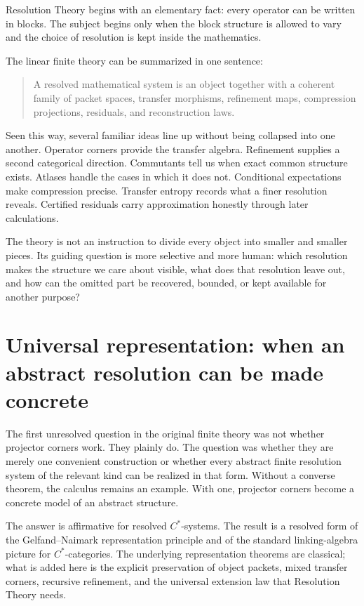 \documentclass[11pt]{article}
\theoremstyle{definition}
\theoremstyle{remark}
\begin{document}
Resolution Theory begins with an elementary fact: every operator can be written in blocks.  The subject begins only when the block structure is allowed to vary and the choice of resolution is kept inside the mathematics.

The linear finite theory can be summarized in one sentence:

\begin{quote}
A resolved mathematical system is an object together with a coherent family of packet spaces, transfer morphisms, refinement maps, compression projections, residuals, and reconstruction laws.
\end{quote}

Seen this way, several familiar ideas line up without being collapsed into one another.  Operator corners provide the transfer algebra.  Refinement supplies a second categorical direction.  Commutants tell us when exact common structure exists.  Atlases handle the cases in which it does not.  Conditional expectations make compression precise.  Transfer entropy records what a finer resolution reveals.  Certified residuals carry approximation honestly through later calculations.

The theory is not an instruction to divide every object into smaller and smaller pieces.  Its guiding question is more selective and more human: which resolution makes the structure we care about visible, what does that resolution leave out, and how can the omitted part be recovered, bounded, or kept available for another purpose?



\section{Universal representation: when an abstract resolution can be made concrete}
\label{sec:universal-resolution-representation}

The first unresolved question in the original finite theory was not whether projector corners work.  They plainly do.  The question was whether they are merely one convenient construction or whether every abstract finite resolution system of the relevant kind can be realized in that form.  Without a converse theorem, the calculus remains an example.  With one, projector corners become a concrete model of an abstract structure.

The answer is affirmative for resolved $C^*$-systems.  The result is a resolved form of the Gelfand--Naimark representation principle and of the standard linking-algebra picture for $C^*$-categories.  The underlying representation theorems are classical; what is added here is the explicit preservation of object packets, mixed transfer corners, recursive refinement, and the universal extension law that Resolution Theory needs.
\end{document}
